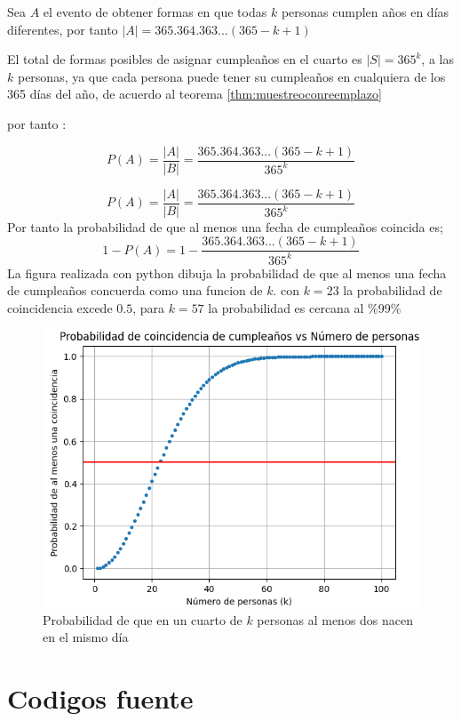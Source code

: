 \documentclass[
]{book}
\theoremstyle{definition}
\theoremstyle{definition}
\theoremstyle{definition}
\theoremstyle{definition}
\theoremstyle{remark}
\begin{document}
Sea \(A\) el evento de obtener formas en que todas \(k\) personas cumplen años en días diferentes, por tanto \(|A|=365.364.363...(365-k+1)\)

El total de formas posibles de asignar cumpleaños en el cuarto es \(|S|=365^k\), a las \(k\) personas, ya que cada persona puede tener su cumpleaños en cualquiera de los 365 días del año, de acuerdo al teorema \ref{thm:muestreoconreemplazo}

por tanto :

\[P(A)=\frac{|A|}{|B|} =\frac{365.364.363...(365-k+1)}{365^k}  \]

\[P(A)=\frac{|A|}{|B|} =\frac{365.364.363...(365-k+1)}{365^k}  \]
Por tanto la probabilidad de que al menos una fecha de cumpleaños coincida es;
\[1 - P(A) = 1- \frac{365.364.363...(365-k+1)}{365^k}  \]
La figura realizada con python dibuja la probabilidad de que al menos una fecha de cumpleaños concuerda como una funcion de \(k\). con \(k=23\) la probabilidad de coincidencia excede \(0.5\), para \(k=57\) la probabilidad es cercana al \%99\%

\begin{figure}

{\centering \includegraphics[width=0.6\linewidth]{./images/paradojacumpleanos} 

}

\caption{Probabilidad de  que en un cuarto de $k$ personas al menos dos nacen en el mismo día}\label{fig:unnamed-chunk-7}
\end{figure}

\hypertarget{codigos-fuente}{%
\chapter*{Codigos fuente}\label{codigos-fuente}}
\end{document}
